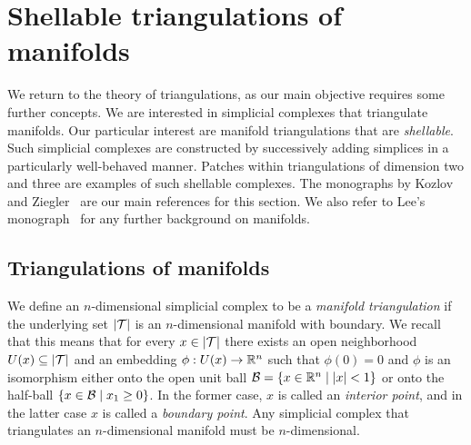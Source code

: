 \documentclass[10pt,letterpaper]{article}
\begin{document}























\section{Shellable triangulations of manifolds}\label{section:advancedtriangulations}

We return to the theory of triangulations,
as our main objective requires some further concepts.
We are interested in simplicial complexes that triangulate manifolds. 
Our particular interest are manifold triangulations that are \emph{shellable}.
Such simplicial complexes are constructed by successively adding simplices in a particularly well-behaved manner. 
Patches within triangulations of dimension two and three are examples of such shellable complexes. 
The monographs by Kozlov~\cite{kozlov2008combinatorial} and Ziegler~\cite{ziegler2012lectures} are our main references for this section. 
We also refer to Lee's monograph~\cite{lee2011topological} for any further background on manifolds. 

\subsection{Triangulations of manifolds}

We define an $n$-dimensional simplicial complex to be a \emph{manifold triangulation} if the underlying set $\left| {\mathcal T} \right|$ is an $n$-dimensional manifold with boundary.
We recall that this means that for every $x \in \left| {\mathcal T} \right|$
there exists an open neighborhood $U(x) \subseteq \left| {\mathcal T} \right|$ and an embedding $\phi : U(x) \rightarrow {\mathbb R}^{n}$
such that $\phi(0) = 0$ and $\phi$ is an isomorphism either onto the open unit ball $\calB = \{ x \in \bbR^{n} \suchthat |x| < 1 \}$
or onto the half-ball $\{ x \in \calB \suchthat x_1 \geq 0 \}$.
In the former case, $x$ is called an \emph{interior point}, and in the latter case $x$ is called a \emph{boundary point}. 
Any simplicial complex that triangulates an $n$-dimensional manifold must be $n$-dimensional.
\end{document}

